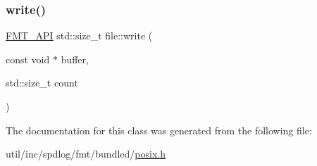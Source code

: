 \subsubsection{\texorpdfstring{write()}{write()}}
{\footnotesize\ttfamily \hyperlink{core_8h_a9a4960b70582ed2620911a0b75dce0b5}{F\+M\+T\+\_\+\+A\+PI} std\+::size\+\_\+t file\+::write (\begin{DoxyParamCaption}\item[{const void $\ast$}]{buffer,  }\item[{std\+::size\+\_\+t}]{count }\end{DoxyParamCaption})}



The documentation for this class was generated from the following file\+:\begin{DoxyCompactItemize}
\item 
util/inc/spdlog/fmt/bundled/\hyperlink{posix_8h}{posix.\+h}\end{DoxyCompactItemize}

